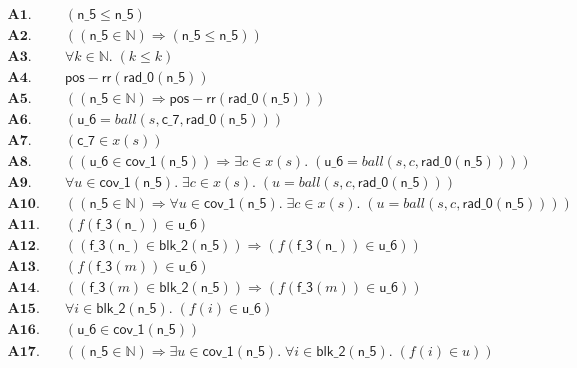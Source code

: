 \documentclass[11pt]{article}
\begin{document}
\begin{align*}
  \mathbf{A1.}\quad & (\mathsf{n\_5} \leq \mathsf{n\_5}) \\
  \mathbf{A2.}\quad & ((\mathsf{n\_5} \in \mathbb{N}) \Rightarrow (\mathsf{n\_5} \leq \mathsf{n\_5})) \\
  \mathbf{A3.}\quad & \forall k \in \mathbb{N}.\; (k \leq k) \\
  \mathbf{A4.}\quad & \mathsf{pos{-}rr}(\mathsf{rad\_0}(\mathsf{n\_5})) \\
  \mathbf{A5.}\quad & ((\mathsf{n\_5} \in \mathbb{N}) \Rightarrow \mathsf{pos{-}rr}(\mathsf{rad\_0}(\mathsf{n\_5}))) \\
  \mathbf{A6.}\quad & (\mathsf{u\_6} = \mathit{ball}(s, \mathsf{c\_7}, \mathsf{rad\_0}(\mathsf{n\_5}))) \\
  \mathbf{A7.}\quad & (\mathsf{c\_7} \in x(s)) \\
  \mathbf{A8.}\quad & ((\mathsf{u\_6} \in \mathsf{cov\_1}(\mathsf{n\_5})) \Rightarrow \exists c \in x(s).\; (\mathsf{u\_6} = \mathit{ball}(s, c, \mathsf{rad\_0}(\mathsf{n\_5})))) \\
  \mathbf{A9.}\quad & \forall u \in \mathsf{cov\_1}(\mathsf{n\_5}).\; \exists c \in x(s).\; (u = \mathit{ball}(s, c, \mathsf{rad\_0}(\mathsf{n\_5}))) \\
  \mathbf{A10.}\quad & ((\mathsf{n\_5} \in \mathbb{N}) \Rightarrow \forall u \in \mathsf{cov\_1}(\mathsf{n\_5}).\; \exists c \in x(s).\; (u = \mathit{ball}(s, c, \mathsf{rad\_0}(\mathsf{n\_5})))) \\
  \mathbf{A11.}\quad & (f(\mathsf{f\_3}(\mathsf{n\_})) \in \mathsf{u\_6}) \\
  \mathbf{A12.}\quad & ((\mathsf{f\_3}(\mathsf{n\_}) \in \mathsf{blk\_2}(\mathsf{n\_5})) \Rightarrow (f(\mathsf{f\_3}(\mathsf{n\_})) \in \mathsf{u\_6})) \\
  \mathbf{A13.}\quad & (f(\mathsf{f\_3}(m)) \in \mathsf{u\_6}) \\
  \mathbf{A14.}\quad & ((\mathsf{f\_3}(m) \in \mathsf{blk\_2}(\mathsf{n\_5})) \Rightarrow (f(\mathsf{f\_3}(m)) \in \mathsf{u\_6})) \\
  \mathbf{A15.}\quad & \forall i \in \mathsf{blk\_2}(\mathsf{n\_5}).\; (f(i) \in \mathsf{u\_6}) \\
  \mathbf{A16.}\quad & (\mathsf{u\_6} \in \mathsf{cov\_1}(\mathsf{n\_5})) \\
  \mathbf{A17.}\quad & ((\mathsf{n\_5} \in \mathbb{N}) \Rightarrow \exists u \in \mathsf{cov\_1}(\mathsf{n\_5}).\; \forall i \in \mathsf{blk\_2}(\mathsf{n\_5}).\; (f(i) \in u)) \\

\end{align*}
\end{document}
